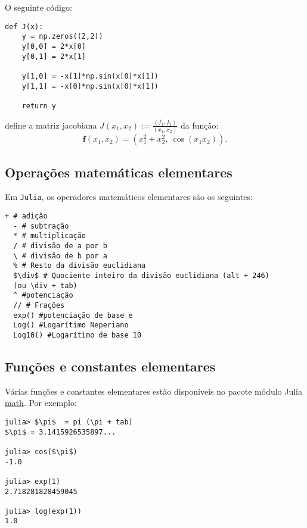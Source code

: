 \begin{ex}
  O seguinte código:
\begin{lstlisting}
def J(x):
    y = np.zeros((2,2))
    y[0,0] = 2*x[0]
    y[0,1] = 2*x[1]

    y[1,0] = -x[1]*np.sin(x[0]*x[1])
    y[1,1] = -x[0]*np.sin(x[0]*x[1])

    return y
\end{lstlisting}
define a matriz jacobiana $J(x_1,x_2) := \frac{(f_1,f_2)}{(x_1,x_2)}$ da função:
\begin{equation}
  \pmb{f}(x_1,x_2) = (x_1^2 + x_2^2,~\cos(x_1x_2)).
\end{equation}
\end{ex}





















\subsection{Operações matemáticas elementares}

Em \verb+Julia+, os operadores matemáticos elementares são os seguintes:
\begin{lstlisting}[mathescape=true]
  + # adição
  - # subtração
  * # multiplicação
  / # divisão de a por b
  \ # divisão de b por a
  % # Resto da divisão euclidiana
  $\div$ # Quociente inteiro da divisão euclidiana (alt + 246)
  (ou \div + tab)
  ^ #potenciação
  // # Frações
  exp() #potenciação de base e
  Log() #Logarítimo Neperiano
  Log10() #Logarítimo de base 10
\end{lstlisting}

\subsection{Funções e constantes elementares}

Várias funções e constantes elementares estão disponíveis no pacote módulo Julia \href{https://docs.Julia.org/3/library/math.html?highlight=math#module-math}{math}. Por exemplo:
\begin{lstlisting}[mathescape=true]
julia> $\pi$  = pi (\pi + tab)
$\pi$ = 3.1415926535897...

julia> cos($\pi$)
-1.0

julia> exp(1)
2.718281828459045

julia> log(exp(1))
1.0
\end{lstlisting}

